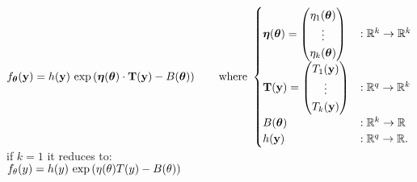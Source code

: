 $\displaystyle  \displaystyle f_{\boldsymbol \theta }(\mathbf{y})=h(\mathbf{y})\, \exp \left({\boldsymbol \eta }({\boldsymbol \theta })\cdot \mathbf{T}(\mathbf{y})-B({\boldsymbol \theta })\right)\qquad \text {where } \begin{cases}  {\boldsymbol \eta }({\boldsymbol \theta })=\begin{pmatrix} \eta _1({\boldsymbol \theta })\\ \vdots \\ \eta _ k({\boldsymbol \theta })\end{pmatrix}& :\mathbb {R}^ k\to \mathbb {R}^ k\\ \mathbf{T}(\mathbf{y})=\begin{pmatrix} T_1(\mathbf{y})\\ \vdots \\ T_ k(\mathbf{y})\end{pmatrix}& :\mathbb {R}^ q\to \mathbb {R}^ k\\ B({\boldsymbol \theta })& :\mathbb {R}^ k\to \mathbb {R}\\ h(\mathbf{y})& :\mathbb {R}^ q\to \mathbb {R}.\\ \end{cases}$\\


if $k=1$ it reduces to:\\

$\displaystyle  \displaystyle f_\theta (y)=h(y)\, \exp \left(\eta (\theta ) T(y)-B(\theta )\right)$

